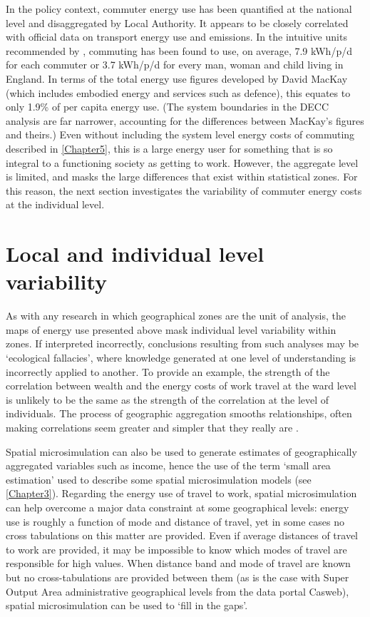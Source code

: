 In the policy context, commuter energy use has been
quantified at the national level and disaggregated by Local Authority.
It appears to be closely correlated with official data on transport energy
use and emissions. In the intuitive units recommended by \citet{MacKay2009},
commuting has been found to use, on average, 7.9 kWh/p/d for each commuter or
3.7 kWh/p/d for every man, woman and child living in England. In terms of
the total energy use figures developed by David MacKay (which includes
embodied energy and services such as defence), this equates to
only 1.9\% of per capita energy use. (The system boundaries in the
DECC analysis are far narrower, accounting for the differences between
MacKay's figures and theirs.) Even without including the system level
energy costs of commuting described in \cref{Chapter5}, this is a large
energy user for something that is so integral to a functioning society as
getting to work. However, the aggregate level is limited, and masks the
large differences that exist within statistical zones.
For this reason, the next section investigates the variability of commuter
energy costs at the individual level.


\section{Local and individual level variability} \label{sindvar}

As with any research in which geographical zones are the unit of analysis,
the maps of energy use presented above mask individual level variability within
zones. If interpreted incorrectly, conclusions resulting from such analyses
may be `ecological fallacies', where knowledge generated
at one level of understanding is incorrectly applied to another.
To provide an example, the strength of the correlation between wealth and the energy
costs of work travel at the ward level is unlikely to be the same as the
strength of the correlation at the level of individuals. The process of
geographic aggregation smooths relationships, often making correlations seem
greater and simpler that they really are \citep{Openshaw1983}. 

Spatial microsimulation can also be used to generate estimates of
geographically aggregated variables such as income, hence the use of the term
`small area estimation' used to describe some spatial microsimulation models
(see \cref{Chapter3}). Regarding the energy use of travel to work, spatial
microsimulation can help overcome a major data constraint at some geographical
levels: energy use is roughly a function of mode and distance of travel, yet
in some cases no cross tabulations on this matter are provided.
Even if average distances of travel to work are provided, it may be
impossible to know which modes of travel are responsible for high values.
When distance band and mode of travel are known but no cross-tabulations
are provided between them (as is the case with Super Output Area administrative
geographical levels from the data portal Casweb),
spatial microsimulation can be used to `fill in the gaps'.


